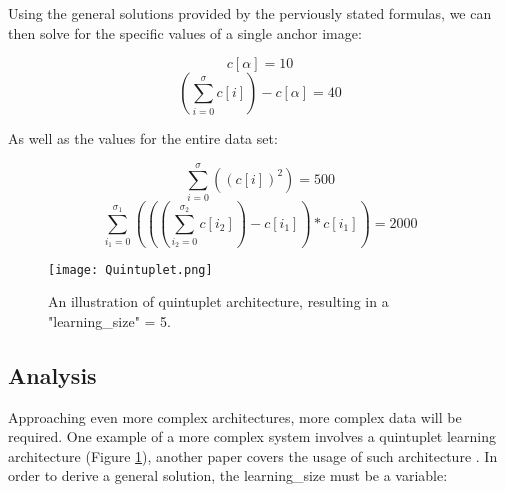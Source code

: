 \documentclass[
	letterpaper, %
	10pt, %
	unnumberedsections, %
	twoside, %
]{LTJournalArticle}
\begin{document}












Using the general solutions provided by the perviously stated formulas, we can then solve for the specific values of a single anchor image:

\[ c[\alpha] = 10 \]
\[ (\sum_{i = 0}^\sigma c[i])- c[\alpha] =  40\]

As well as the values for the entire data set:

\[ \sum_{i = 0}^\sigma ((c[i])^2) = 500 \]
\[ \sum_{i_1 = 0}^{\sigma_1}(((\sum_{i_2 = 0}^{\sigma_2} c[i_2]) - c[i_1]) * c[i_1]) = 2000 \]


\begin{figure} %
	\texttt{[image: Quintuplet.png]}
	\caption{An illustration of quintuplet architecture, resulting in a "learning\_size" = 5.}
	\label{fig:quintuplet}
\end{figure}

\subsection{Analysis}
Approaching even more complex architectures, more complex data will be required. One example of a more complex system involves a quintuplet learning architecture (Figure \ref{fig:quintuplet}), another paper covers the usage of such architecture \autocite{zhai_huang_cheng_zhan_li_liu}. In order to derive a general solution, the learning\_size must be a variable:
\end{document}

